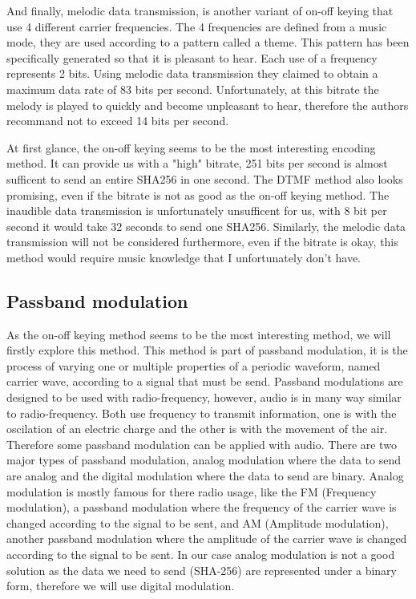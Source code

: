 \documentclass[twocolumn,14pt]{extarticle}
\begin{document}
And finally, melodic data transmission, is another variant of on-off keying that use 4 different carrier frequencies. The 4 frequencies are defined from a music mode, they are used according to a pattern called a theme. This pattern has been specifically generated so that it is pleasant to hear. Each use of a frequency represents 2 bits. Using melodic data transmission they claimed to obtain a maximum data rate of 83 bits per second. Unfortunately, at this bitrate the melody is played to quickly and become unpleasant to hear, therefore the authors recommand not to exceed 14 bits per second.

At first glance, the on-off keying seems to be the most interesting encoding method. It can provide us with a "high" bitrate, 251 bits per second is almost sufficent to send an entire SHA256 in one second. The DTMF method also looks promising, even if the bitrate is not as good as the on-off keying method. The inaudible data transmission is unfortunately unsufficent for us, with 8 bit per second it would take 32 seconds to send one SHA256. Similarly, the melodic data transmission will not be considered furthermore, even if the bitrate is okay, this method would require music knowledge that I unfortunately don't have.

\subsection{Passband modulation}
As the on-off keying method seems to be the most interesting method, we will firstly explore this method. This method is part of passband modulation, it is the process of varying one or multiple properties of a periodic waveform, named carrier wave, according to a signal that must be send. Passband modulations are designed to be used with radio-frequency, however, audio is in many way similar to radio-frequency. Both use frequency to transmit information, one is with the oscilation of an electric charge and the other is with the movement of the air. Therefore some passband modulation can be applied with audio. There are two major types of passband modulation, analog modulation where the data to send are analog and the digital modulation where the data to send are binary. Analog modulation is mostly famous for there radio usage, like the FM (Frequency modulation), a passband modulation where the frequency of the carrier wave is changed according to the signal to be sent, and AM (Amplitude modulation), another passband modulation where the amplitude of the carrier wave is changed according to the signal to be sent. In our case analog modulation is not a good solution as the data we need to send (SHA-256) are represented under a binary form, therefore we will use digital modulation. 
\end{document}
